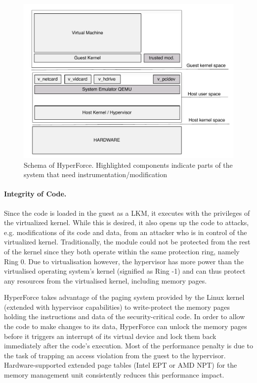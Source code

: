 \begin{figure} 
\begin{center}
\includegraphics[scale=0.5]{images/hyperforce_schema.pdf}
\caption{Schema of HyperForce. Highlighted components indicate parts of the system that need instrumentation/modification}
\label{hyperforce_schema}
\end{center}
\end{figure}

\paragraph{Integrity of Code.}
Since the code is loaded in the guest as a LKM, it executes with the privileges of the virtualized kernel. While this is desired, it also opens up the code to attacks, e.g. modifications of its code and data, from an attacker who is in control of the virtualized kernel. 
Traditionally, the module could not be protected from the rest of the kernel since they both operate within the same protection ring, namely Ring 0. 
Due to virtualisation however, the hypervisor has more power than the virtualised operating system's kernel (signified as Ring -1) and can thus protect any resources from the virtualised kernel, including memory pages. 

HyperForce takes advantage of the paging system provided by the Linux kernel (extended with hypervisor capabilities) to write-protect the memory pages holding the instructions and data of the security-critical code. 
In order to allow the code to make changes to its data, HyperForce can unlock the memory pages before it triggers an interrupt of its virtual device and lock them back immediately after the code's execution. 
Most of the performance penalty is due to the task of trapping an access violation from the guest to the hypervisor. Hardware-supported extended page tables (Intel EPT or AMD NPT) for the memory management unit consistently reduces this performance impact.

